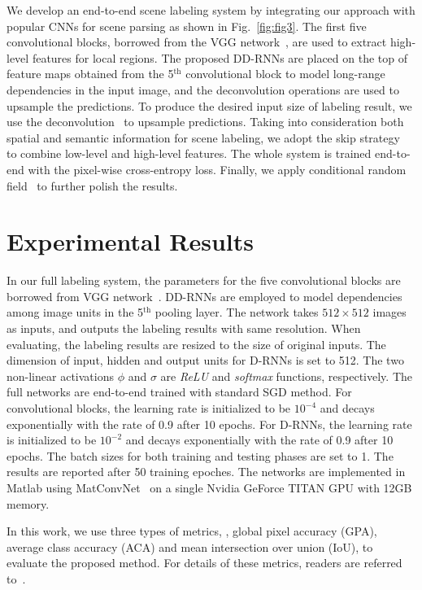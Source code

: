 \documentclass[10pt,twocolumn,letterpaper]{article}
\newcommand{\HL}[1]{\textcolor[rgb]{0.00,0.00,0.00}{#1}}
\begin{document}
We develop an end-to-end scene labeling system by integrating our approach with popular CNNs for scene parsing as shown in Fig.~\ref{fig:fig3}. The first five convolutional blocks, borrowed from the VGG network~\cite{simonyan2014very}, are used to extract high-level features for local regions. The proposed DD-RNNs are placed on the top of feature maps obtained from the 5$^{\mathrm{th}}$ convolutional block to model long-range dependencies in the input image, and the deconvolution operations are used to upsample the predictions. To produce the desired input size of labeling result, we use the deconvolution~\cite{zeiler2011adaptive} to upsample predictions. Taking into consideration both spatial and semantic information for scene labeling, we adopt the skip strategy~\cite{long2015fully} to combine low-level and high-level features. The whole system is trained end-to-end with the pixel-wise cross-entropy loss. \HL{Finally, we apply conditional random field~\cite{krahenbuhl2011efficient} to further polish the results.}

\section{Experimental Results}
\label{sec_res}

 In our full labeling system, the parameters for the five convolutional blocks are borrowed from VGG network~\cite{simonyan2014very}. DD-RNNs are employed to model dependencies among image units in the 5$^{\mathrm{th}}$ pooling layer. The network takes $512\times{512}$ images as inputs, and outputs the labeling results with same resolution. When evaluating, the labeling results are resized to the size of original inputs. The dimension of input, hidden and output units for D-RNNs is set to 512. The two non-linear activations $\phi$ and $\sigma$ are {\it ReLU} and {\it softmax} functions, respectively. The full networks are end-to-end trained with standard SGD method. For convolutional blocks, the learning rate is initialized to be $10^{-4}$
and decays exponentially with the rate of 0.9 after 10 epochs. For D-RNNs, the learning rate is initialized to be $10^{-2}$ and decays exponentially with the rate of 0.9 after 10 epochs. The batch sizes for both training and testing phases are set to 1. The results are reported after 50 training epoches. The networks are implemented in Matlab using MatConvNet~\cite{vedaldi2015matconvnet} on a single Nvidia GeForce TITAN GPU with 12GB memory.

 In this work, we use three types of metrics, \ie, global pixel accuracy (GPA), average class accuracy (ACA) and mean intersection over union (IoU), to evaluate the proposed method. For details of these metrics, readers are referred to~\cite{long2015fully}.
\end{document}
